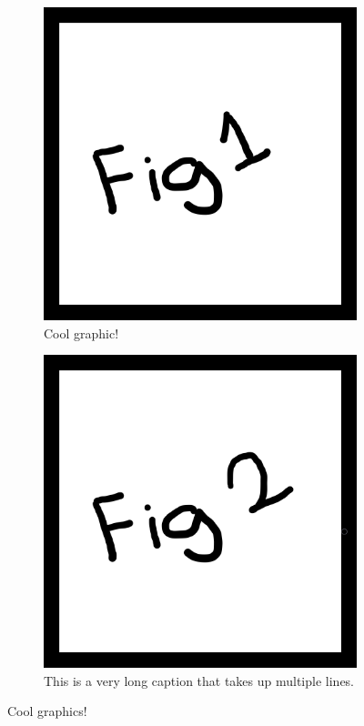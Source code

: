 \begin{figure}[!htb]
	\centering
    \begin{subfigure}[t]{0.49\textwidth}
        \centering
		\includegraphics[width=\textwidth,keepaspectratio]{Figures/ExampleFigure1.png}
	    \caption{Cool graphic!}
        \label{fig:Example4a}
    \end{subfigure}
    \begin{subfigure}[t]{0.49\textwidth}
        \centering
		\includegraphics[width=\textwidth,keepaspectratio]{Figures/ExampleFigure2.png}
	    \caption{This is a very long caption that takes up multiple lines.}
        \label{fig:Example4b}
    \end{subfigure}
    \caption{Cool graphics!}
    \label{fig:Example4}
\end{figure}


